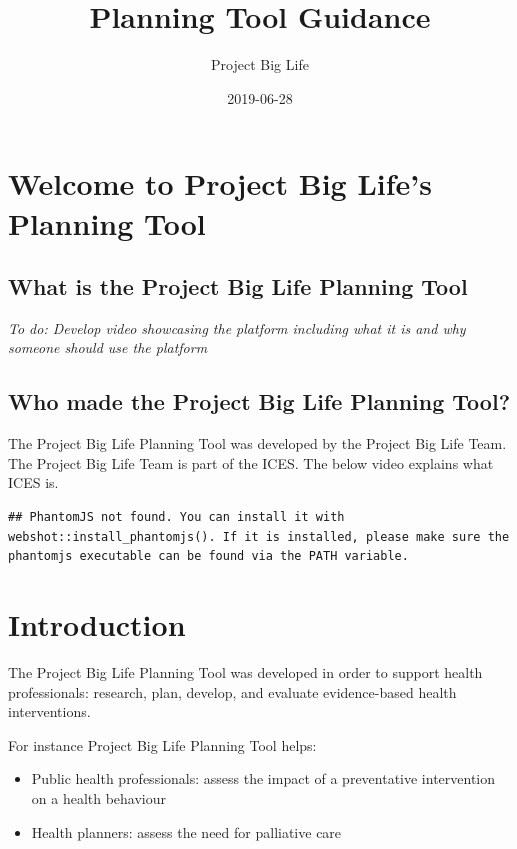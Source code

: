 \documentclass[]{book}
\title{Planning Tool Guidance}
\author{Project Big Life}
\date{2019-06-28}
\providecommand{\tightlist}{%
  \setlength{\itemsep}{0pt}\setlength{\parskip}{0pt}}
\begin{document}
\maketitle

{
\setcounter{tocdepth}{1}
\tableofcontents
}
\chapter{Welcome to Project Big Life's Planning
Tool}\label{welcome-to-project-big-lifes-planning-tool}

\section{What is the Project Big Life Planning
Tool}\label{what-is-the-project-big-life-planning-tool}

\emph{To do: Develop video showcasing the platform including what it is
and why someone should use the platform}

\section{Who made the Project Big Life Planning
Tool?}\label{who-made-the-project-big-life-planning-tool}

The Project Big Life Planning Tool was developed by the Project Big Life
Team. The Project Big Life Team is part of the ICES. The below video
explains what ICES is.

\begin{verbatim}
## PhantomJS not found. You can install it with webshot::install_phantomjs(). If it is installed, please make sure the phantomjs executable can be found via the PATH variable.
\end{verbatim}

\chapter{Introduction}\label{introduction}

The Project Big Life Planning Tool was developed in order to support
health professionals: research, plan, develop, and evaluate
evidence-based health interventions.

For instance Project Big Life Planning Tool helps:

\begin{itemize}
\tightlist
\item
  Public health professionals: assess the impact of a preventative
  intervention on a health behaviour
\item
  Health planners: assess the need for palliative care
\end{itemize}
\end{document}
